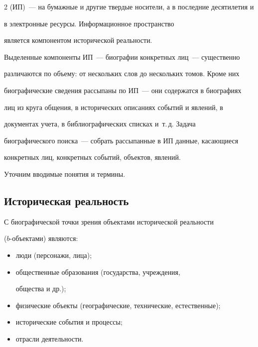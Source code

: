 \begin{multicols}{2}
(ИП)~--- на бумажные и другие твердые носители, а в последние десятилетия и 


в электронные ресурсы. Информационное пространство 


является компонентом исторической реальности. 


Выделенные компоненты ИП~--- биографии конкретных лиц~--- существенно 


различаются по объему: от нескольких слов до нескольких томов. Кроме них 


биографические сведения рассыпаны по ИП~--- они содержатся в биографиях 


лиц из круга общения, в исторических описаниях событий и явлений, в 


документах учета, в библиографических списках и~т.\,д. Задача 


биографического поиска~--- собрать рассыпанные в ИП данные, касающиеся 


конкретных лиц, конкретных событий, объектов, явлений.


  


  Уточним вводимые понятия и термины.





\subsection{Историческая реальность}


  


  С биографической точки зрения объектами исторической реальности 


  ($b$-объектами) являются:


  \begin{itemize}


\item люди (персонажи, лица);


\item общественные образования (государства, учреж\-де\-ния, 


общества и др.);


\item физические объекты (географические, технические, естественные);


\item исторические события и процессы; 


\item отрасли деятельности.



\end{itemize}
\end{multicols}
